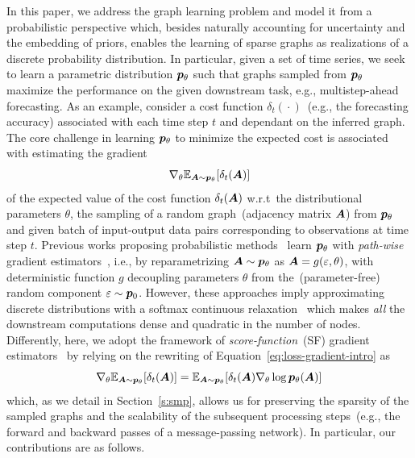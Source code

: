 In this paper, we address the graph learning problem and model it from a probabilistic perspective which, besides naturally accounting for uncertainty and the embedding of priors, enables the learning of sparse graphs as realizations of a discrete probability distribution. In particular, given a set of time series, we seek to learn a parametric distribution ${{\bm{p}}_\theta}$ such that graphs sampled from ${{\bm{p}}_\theta}$ maximize the performance on the given downstream task, e.g., multistep-ahead forecasting. As an example, consider a cost function $\delta_t({}\cdot{})$~(e.g., the forecasting accuracy) associated with each time step $t$ and dependant on the inferred graph. The core challenge in learning ${{\bm{p}}_\theta}$ to minimize the expected cost is associated with estimating the gradient
\begin{equation}\label{eq:loss-gradient-intro}
\nabla_\theta \mathbb{E}_{{\bm{A}}\sim {{\bm{p}}_\theta}}[\delta_t({\bm{A}})]
\end{equation}
of the expected value of the cost function $\delta_t({\bm{A}})$ w.r.t\ the distributional parameters $\theta$, the sampling of a random graph~(adjacency matrix ${\bm{A}}$) from ${{\bm{p}}_\theta}$ and given batch of input-output data pairs corresponding to observations at time step $t$. 
Previous works proposing probabilistic methods~\citep{shang2021discrete, kipf2018neural} learn ${{\bm{p}}_\theta}$ with \emph{path-wise} gradient estimators~\citep{glasserman1991gradient, kingma2014auto}, i.e., by reparametrizing ${\bm{A}}\sim{{\bm{p}}_\theta}$ as ${\bm{A}}=g(\varepsilon,\theta)$, with deterministic function $g$ decoupling parameters $\theta$ from the~(parameter-free) random component $\varepsilon\sim {\bm{p}}_0$. 
However, these approaches imply approximating discrete distributions with a softmax continuous relaxation~\citep{paulus2020gradient} which makes \emph{all} the downstream computations dense and quadratic in the number of nodes. Differently, here, we adopt the framework of \emph{score-function}~(SF) gradient estimators~\citep{rubinstein1969some, williams1992simple, mohamed2020monte} by relying on the rewriting of Equation~\eqref{eq:loss-gradient-intro} as
\begin{equation}
\nabla_\theta\mathbb{E}_{{\bm{A}}\sim {{\bm{p}}_\theta}}[\delta_t({\bm{A}})]
= \mathbb{E}_{{\bm{A}}\sim{{\bm{p}}_\theta}}[\delta_t({\bm{A}})\nabla_\theta \log {{\bm{p}}_\theta}({\bm{A}})]
\end{equation}
which, as we detail in Section~\ref{s:smp}, allows us for preserving the sparsity of the sampled graphs and the scalability of the subsequent processing steps~(e.g., the forward and backward passes of a message-passing network). In particular, our contributions are as follows.
